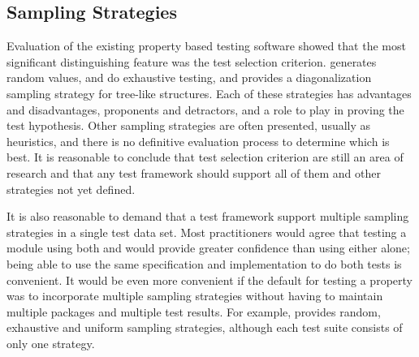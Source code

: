 %
%
%

\subsection{Sampling Strategies}

Evaluation of the existing property based testing software showed that 
the most significant distinguishing feature was the test selection criterion.
\QC generates random values, \SC and \GAST do exhaustive testing,
and \EC provides a diagonalization sampling strategy for tree-like structures.
Each of these strategies has advantages and disadvantages,
proponents and detractors, and a role to play in proving the test hypothesis.
Other sampling strategies are often presented, usually as heuristics,
and there is no definitive evaluation process to determine which is best.
It is reasonable to conclude that test selection criterion are still
an area of research and that any test framework should support
all of them and other strategies not yet defined.

It is also reasonable to demand that a test framework support
multiple sampling strategies in a single test data set.
Most practitioners would agree that testing a module
using both \QC and \SC would provide greater confidence
than using either alone; being able to use the same specification
and implementation to do both tests is convenient.
It would be even more convenient if the default for testing a property
was to incorporate multiple sampling strategies without
having to maintain multiple packages and multiple test results.
For example, \FEAT provides random, exhaustive and uniform sampling strategies,
although each test suite consists of only one strategy.

